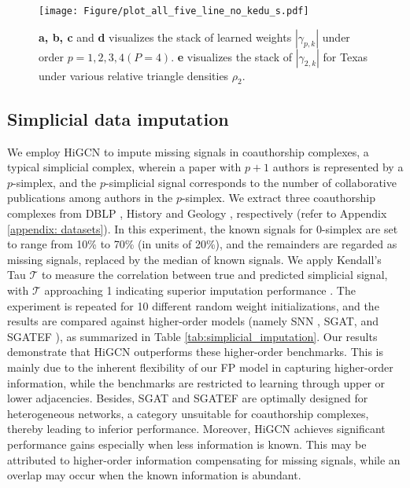 \documentclass[letterpaper]{article} \usepackage{aaai24}
\theoremstyle{plain}
\theoremstyle{definition}
\theoremstyle{remark}
\begin{document}
\begin{figure*}[!t]
\centering
\texttt{[image: Figure/plot\_all\_five\_line\_no\_kedu\_s.pdf]}
\caption{{\bf a, b, c} and {\bf d} visualizes the stack of learned weights $|\gamma_{p,k}|$ under order $p=1,2,3,4 (P=4)$. \textbf{e} visualizes the stack of $|\gamma_{2,k}|$ for Texas under various relative triangle densities $\rho_2$.}
\label{fig:stack5}
\end{figure*}

\subsection{Simplicial data imputation}
We employ HiGCN to impute missing signals in coauthorship complexes, a typical simplicial complex, wherein a paper with $p+1$ authors is represented by a $p$-simplex, and the $p$-simplicial signal corresponds to the number of collaborative publications among authors in the $p$-simplex. 
We extract three coauthorship complexes from DBLP \cite{data:DBLP-Benson2018}, History and Geology \cite{data:MAG-His-Geo}, respectively (refer to Appendix \ref{appendix: datasets}).  
In this experiment, the known signals for $0$-simplex are set to range from 10\% to 70\% (in units of 20\%), and the remainders are regarded as missing signals, replaced by the median of known signals. We apply Kendall's Tau $\mathcal{T}$ to measure the correlation between true and predicted simplicial signal, with $\mathcal{T}$ approaching 1 indicating superior imputation performance \cite{kendall1938new}.
The experiment is repeated for 10 different random weight initializations, and the results are compared against higher-order models (namely SNN \cite{SNN2020}, SGAT, and SGATEF \cite{SGAT}), as summarized in Table \ref{tab:simplicial_imputation}.
Our results demonstrate that HiGCN outperforms these higher-order benchmarks.
This is mainly due to the inherent flexibility of our FP model in capturing higher-order information, while the benchmarks are restricted to learning through upper or lower adjacencies.
Besides, SGAT and SGATEF are optimally designed for  heterogeneous networks, a category unsuitable for coauthorship complexes, thereby leading to inferior performance.
Moreover, HiGCN achieves significant performance gains especially when less information is known. This may be attributed to higher-order information compensating for missing signals, while an overlap may occur when the known information is abundant.
\end{document}
